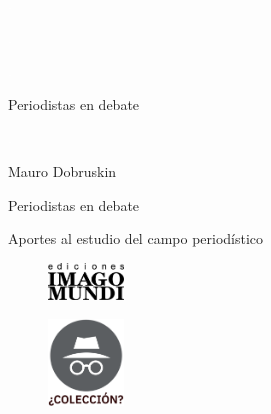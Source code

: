 \newpage
\thispagestyle{empty}
{\textcolor{white}{.}}

\newpage
\thispagestyle{empty}
{\textcolor{white}{.}}

\newpage
\thispagestyle{empty}
{\textcolor{white}{.}}

\vspace{30mm}

\begin{center}
	\LARGE{Periodistas en debate}
\end{center}

\newpage
\thispagestyle{empty}
{\textcolor{white}{.}}

\newpage
\thispagestyle{empty}
\begin{center}%
{\sc\large{Mauro Dobruskin}}\\ %
\end{center}

\vspace{30mm}

\begin{center}
\LARGE{Periodistas en debate}\\\vspace{10mm}

\Large{Aportes al estudio del campo periodístico}
\end{center}

\vfill

\begin{figure}[b]
\centering
\includegraphics[width=20mm]{./media/logo-imago-ByW.png}
\end{figure}

\newpage
\thispagestyle{empty}
\begin{figure}[t]
\centering
\vspace{-10mm}
\includegraphics[width=20mm]{./media/desconocido.png}\\
\end{figure}

